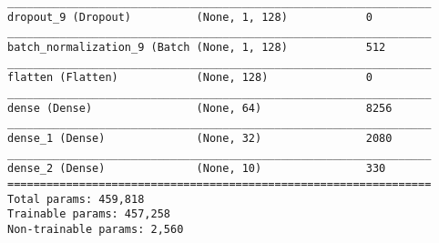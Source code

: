 {\begin{verbatim}
_________________________________________________________________
dropout_9 (Dropout)          (None, 1, 128)            0         
_________________________________________________________________
batch_normalization_9 (Batch (None, 1, 128)            512       
_________________________________________________________________
flatten (Flatten)            (None, 128)               0         
_________________________________________________________________
dense (Dense)                (None, 64)                8256      
_________________________________________________________________
dense_1 (Dense)              (None, 32)                2080      
_________________________________________________________________
dense_2 (Dense)              (None, 10)                330       
=================================================================
Total params: 459,818
Trainable params: 457,258
Non-trainable params: 2,560
\end{verbatim}
}

